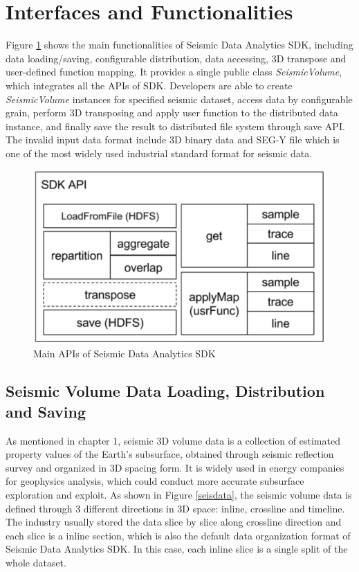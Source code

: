 \section{Interfaces and Functionalities}

Figure \ref{sdk_interface} shows the main functionalities of Seismic Data Analytics SDK, including data loading/saving, configurable distribution, data accessing, 3D transpose and user-defined function mapping. It provides a single public class \emph{SeismicVolume}, which integrates all the APIs of SDK. Developers are able to create \emph{SeismicVolume} instances for specified seismic dataset, access data by configurable grain, perform 3D transposing and apply user function to the distributed data instance, and finally save the result to distributed file system through save API. The invalid input data format include 3D binary data and SEG-Y file \cite{SEGDREV21} which is one of the most widely used industrial standard format for seismic data.

\begin{figure}[h]
\centering
\includegraphics[scale=0.6]{figures/sdk_interface.png}
\caption{Main APIs of Seismic Data Analytics SDK}
\label{sdk_interface}
\end{figure}

\subsection{Seismic Volume Data Loading, Distribution and Saving}

As mentioned in chapter 1, seismic 3D volume data is a collection of estimated property values of the Earth's subsurface, obtained through seismic reflection survey and organized in 3D spacing form. It is widely used in energy companies for geophysics analysis, which could conduct more accurate subsurface exploration and exploit. As shown in Figure \ref{seisdata}, the seismic volume data is defined through 3 different directions in 3D space: inline, crossline and timeline. The industry usually stored the data slice by slice along crossline direction and each slice is a inline section, which is also the default data organization format of Seismic Data Analytics SDK. In this case, each inline slice is a single split of the whole dataset.

